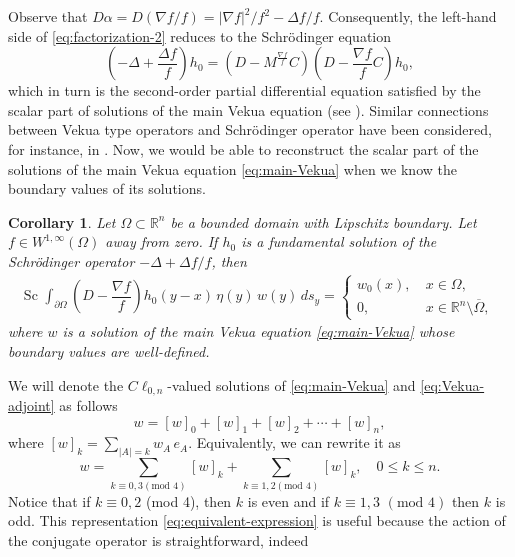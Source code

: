 \documentclass[12pt]{article}
\newtheorem{corollary}[theorem]{Corollary}
\def\R{\mathbb{R}}
\begin{document}
Observe that $D\alpha=D(\nabla f/f)=|\nabla f|^2/f^2-\Delta f/f$. Consequently, the left-hand side of \eqref{eq:factorization-2} reduces to the Schrödinger equation
\begin{equation}\label{eq:factorization-3}
    \left(-\Delta+\dfrac{\Delta f}{f}\right)h_0=\left(D-M^{\frac{\nabla f}{f}}C\right)\left(D-\dfrac{\nabla f}{f} C\right)h_0,
\end{equation}
which in turn is the second-order partial differential equation satisfied by the scalar part of solutions of the main Vekua equation (see \cite[Cor.\ 1]{Delgado2023}). Similar connections between Vekua type operators and Schr\"{o}dinger operator have been considered, for instance, in \cite{Bernstein1996, Krav2006}. Now, we would be able to reconstruct the scalar part of the solutions of the main Vekua equation \eqref{eq:main-Vekua} when we know the boundary values of its solutions.
\begin{corollary}\label{cor:main-Cauchy}
Let $\Omega\subset \mathbb{R}^n$ be a bounded domain with Lipschitz boundary. Let $f\in W^{1,\infty}(\Omega)$ away from zero. If $h_0$ is a fundamental solution of the Schrödinger operator $-\Delta+\Delta f/f$, then
\begin{align*}
\text{Sc }\int_{\partial\Omega} \left(D-\dfrac{\nabla f}{f}\right)h_0(y-x)\, \eta(y) \, w(y) \,ds_{y}=\left\{
   \begin{array}{ll}
      w_0(x), \ & x\in \Omega,\\
      0,           & x\in \R^n\setminus \overline{\Omega},
   \end{array}
\right.
\end{align*}
where $w$ is a solution of the main Vekua equation \eqref{eq:main-Vekua} whose boundary values are well-defined.
\end{corollary}
We will denote the $C\ell_{0,n}$-valued solutions of \eqref{eq:main-Vekua} and \eqref{eq:Vekua-adjoint} as follows
\[
w=[w]_0+[w]_1+[w]_2+\cdots+[w]_n,
\]
where $[w]_k=\sum_{|A|=k} w_A\, e_A$. Equivalently, we can rewrite it as 
\begin{equation}\label{eq:equivalent-expression}
w=\sum_{k\equiv 0,3 (\text{mod } 4)} [w]_k+\sum_{k\equiv 1,2 (\text{mod } 4)} [w]_k, \quad 0\leq k\leq n.
\end{equation}
Notice that if $k\equiv 0,2$ (mod 4), then $k$ is even and if $k\equiv 1,3$ $(\text{mod }4)$ then $k$ is odd. This representation \eqref{eq:equivalent-expression} is useful because the action of the conjugate operator is straightforward, indeed
\end{document}
